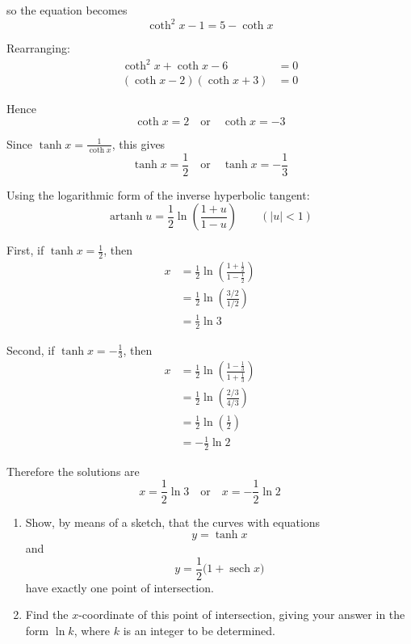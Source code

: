 \documentclass[leqno]{article}
\begin{document}
\begin{enumerate}[
  label=\textbf{\arabic*.},
  leftmargin=*,
  topsep=0pt,
  partopsep=0pt,
  parsep=0pt
]
\begin{djsSolution}
\begin{enumerate}[label=\textbf{(\alph*)}]
  so the equation becomes
  \[
  \coth^2 x-1=5-\coth x
  \]

  Rearranging:
  \begin{align*}
  \coth^2 x+\coth x-6&=0\\
  (\coth x-2)(\coth x+3)&=0
  \end{align*}

  Hence
  \[
  \coth x=2 \quad \text{or} \quad \coth x=-3
  \]

  Since \(\tanh x=\frac{1}{\coth x}\), this gives
  \[
  \tanh x=\frac12 \quad \text{or} \quad \tanh x=-\frac13
  \]

  Using the logarithmic form of the inverse hyperbolic tangent:
  \[
  \operatorname{artanh} u=\frac12\ln\left(\frac{1+u}{1-u}\right)\qquad (|u|<1)
  \]

  First, if \(\tanh x=\frac12\), then
  \begin{align*}
  x&=\frac12\ln\left(\frac{1+\frac12}{1-\frac12}\right) \\
  &=\frac12\ln\left(\frac{3/2}{1/2}\right) \\
  &=\frac12\ln 3
  \end{align*}

  Second, if \(\tanh x=-\frac13\), then
  \begin{align*}
  x&=\frac12\ln\left(\frac{1-\frac13}{1+\frac13}\right) \\
  &=\frac12\ln\left(\frac{2/3}{4/3}\right) \\
  &=\frac12\ln\left(\frac12\right) \\
  &=-\frac12\ln 2
  \end{align*}

  Therefore the solutions are
  \[
  x=\frac{1}{2}\ln 3
  \quad \text{or} \quad
  x=-\frac{1}{2}\ln 2
  \]
\end{enumerate}
\end{djsSolution}


\newpage

\questionitem

\begin{enumerate}[label=\textbf{(\alph*)}]
  \item Show, by means of a sketch, that the curves with equations
  \[
  y = \tanh x
  \]
  and
  \[
  y = \frac{1}{2}\bigl(1 + \operatorname{sech} x\bigr)
  \]
  have exactly one point of intersection.  \\
  \item Find the $x$-coordinate of this point of intersection, giving your answer in the form $\ln k$, where $k$ is an integer to be determined.  \\
\end{enumerate}


\end{enumerate}
\end{document}
